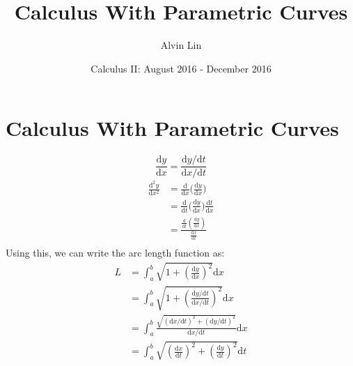 \documentclass[letterpaper, 12pt]{article}
\title{Calculus With Parametric Curves}
\author{Alvin Lin}
\date{Calculus II: August 2016 - December 2016}
\newcommand*{\diff}{\mathrm{d}}
\newcommand*{\Diff}[1]{\mathrm{d^#1}}
\begin{document}
\maketitle

\section*{Calculus With Parametric Curves}
\[ \frac{\diff{y}}{\diff{x}} = \frac{\diff{y}/\diff{t}}{\diff{x}/\diff{t}} \]
\begin{align*}
  \frac{\Diff{2}{y}}{\diff{x}^{2}} &=
    \frac{\diff}{\diff{x}}\bigg(\frac{\diff{y}}{\diff{x}}\bigg) \\
  &= \frac{\diff}{\diff{t}}\bigg(\frac{\diff{y}}{\diff{x}}\bigg)
     \frac{\diff{t}}{\diff{x}} \\
  &= \frac{\frac{\diff}{\diff{t}}(\frac{\diff{y}}{\diff{x}})}
      {\frac{\diff{x}}{\diff{t}}} \\
\end{align*}
Using this, we can write the arc length function as:
\begin{align*}
  L &= \int_{a}^{b}{\sqrt{1+(\frac{\diff{y}}{\diff{x}})^{2}}\diff{x}} \\
  &= \int_{a}^{b}{
    \sqrt{1+(\frac{\diff{y}/\diff{t}}{\diff{x}/\diff{t}})^{2}}\diff{x}} \\
  &= \int_{a}^{b}{\frac{
    \sqrt{(\diff{x}/\diff{t})^{2}+(\diff{y}/\diff{t})^{2}}
  }{\diff{x}/\diff{t}}\diff{x}} \\
  &= \int_{a}^{b}{\sqrt{
    (\frac{\diff{x}}{\diff{t}})^{2}+(\frac{\diff{y}}{\diff{t}})^{2}}\diff{t}}
\end{align*}
\end{document}
